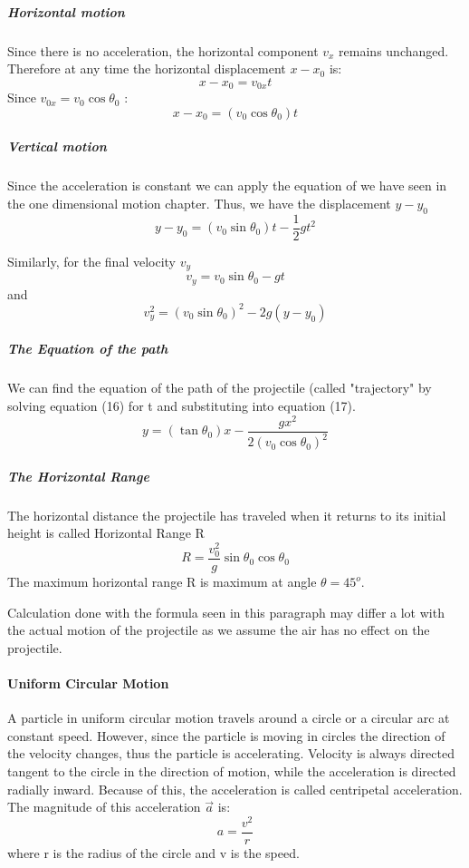 \documentclass{scrartcl}
\begin{document}
    \subparagraph{\small{Horizontal motion}} Since there is no acceleration, the horizontal component $v_x$ remains unchanged. Therefore at any time  the horizontal displacement $x - x_0$ is:
    \begin{equation}
        x - x_0 = v_{0x}t
    \end{equation}
    Since $v_{0x} = v_0 \cos{\theta_0}$ : 
    \begin{equation}
        x - x_0 = (v_0 \cos{\theta_0})t
    \end{equation}
    
    \subparagraph{\small{Vertical motion}} Since the acceleration is constant we can apply the equation of we have seen in the one dimensional motion chapter. Thus, we have the displacement $y- y_0$
    \begin{equation}
        y - y_0 = (v_{0} \sin{\theta_0})t - \frac{1}{2}gt^2
    \end{equation}
    
    Similarly, for the final velocity $v_y$
    \begin{equation}
        v_y = v_0 \sin{\theta_0} - gt 
    \end{equation}
    and
    \begin{equation}
        v^2_y = (v_0 \sin{\theta_0})^2 - 2g(y-y_0)
    \end{equation}
    \subparagraph{\small{The Equation of the path}} We can find the equation of the path of the projectile (called "trajectory" by solving equation (16) for t and substituting into equation (17).
    \begin{equation}
        y = (\tan{\theta_0})x - \frac{gx^2}{2(v_0 \cos{\theta_0})^2}
    \end{equation}
    \subparagraph{\small{The Horizontal Range}} The horizontal distance the projectile has traveled when it returns to its initial height is called Horizontal Range R
    \begin{equation}
        R = \frac{v^2_0}{g} \sin{\theta_0} \cos{\theta_0}
    \end{equation}
    The maximum horizontal range R is maximum at angle $\theta = 45^o$.
    
    Calculation done with the formula seen in this paragraph may differ a lot with the actual motion of the projectile as we assume the air has no effect on the projectile. 
    
    \paragraph{Uniform Circular Motion} A particle in uniform circular motion travels around a circle or a circular arc at constant speed. However, since the particle is moving in circles the direction of the velocity changes, thus the particle is accelerating. Velocity is always directed tangent to the circle in the direction of motion, while the acceleration is directed radially inward. Because of this, the acceleration is called centripetal acceleration. The magnitude of this acceleration $\vec{a}$ is:
    \begin{equation}
        a = \frac{v^2}{r}
    \end{equation}
    where r is the radius of the circle and v is the speed.
    
\end{document}
